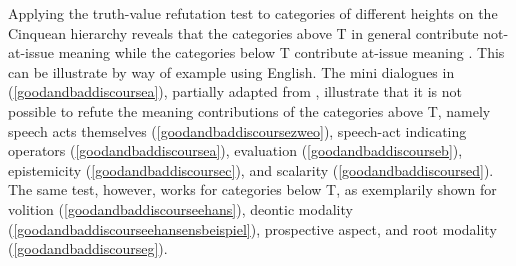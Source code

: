 Applying the truth-value refutation test to categories of different heights on the Cinquean hierarchy reveals that the categories above T in general contribute not-at-issue meaning while the categories below T contribute at-issue meaning \citep{bross2017scope}. This can be illustrate by way of example using English. The mini dialogues in (\ref{goodandbaddiscoursea}), partially adapted from \citep[10]{bross2017scope}, illustrate that it is not possible to refute the meaning contributions of the categories above T, namely speech acts themselves (\ref{goodandbaddiscoursezweo}), speech-act indicating operators (\ref{goodandbaddiscoursea}), evaluation (\ref{goodandbaddiscourseb}), epistemicity (\ref{goodandbaddiscoursec}), and scalarity (\ref{goodandbaddiscoursed}). The same test, however, works for categories below T, as exemplarily shown for volition (\ref{goodandbaddiscourseehans}), deontic modality (\ref{goodandbaddiscourseehansensbeispiel}), prospective aspect, and root modality (\ref{goodandbaddiscourseg}).

